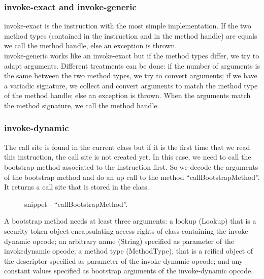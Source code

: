 \documentclass{sig-alternate}
\begin{document}
    \subsubsection{invoke-exact and invoke-generic}
      invoke-exact is the instruction with the most simple implementation.
      If the two method types (contained in the instruction and in the method handle) are equals we call the method handle,
      else an exception is thrown.\\
      
      invoke-generic works like an invoke-exact but if the method types differ, we try to adapt arguments.
      Different treatments can be done:
      if the number of arguments is the same between the two method types, we try to convert arguments;
      if we have a variadic signature, we collect and convert arguments to match the method type of the method handle;
      else an exception is thrown.
      When the arguments match the method signature, we call the method handle.
  
    \subsubsection{invoke-dynamic}
      The call site is found in the current class but if it is the first time that we read this instruction, the call site is not created yet.
      In this case, we need to call the bootstrap method associated to the instruction first.
      So we decode the arguments of the bootstrap method and do an up call to the method ``callBootstrapMethod''.%
      It returns a call site that is stored in the class.

      \begin{figure}[!h]
        \centering \vspace{-1.5em}
        \caption{snippet - ``callBootstrapMethod''.}\vspace{-1em}
        \label{implBSM}
      \end{figure}

      A bootstrap method needs at least three arguments:
      a lookup (Lookup) that is a security token object encapsulating access rights of class containing the invoke-dynamic opcode;
      an arbitrary name (String) specified as parameter of the invokedynamic opcode;
      a method type (MethodType), that is a reified object of the descriptor specified as parameter of the invoke-dynamic opcode;
      and any constant values specified as bootstrap arguments of the invoke-dynamic opcode.
\end{document}

